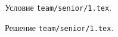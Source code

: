 \problem
Условие \texttt{team/senior/1.tex}.

\solution Решение \texttt{team/senior/1.tex}.
\endproblem
